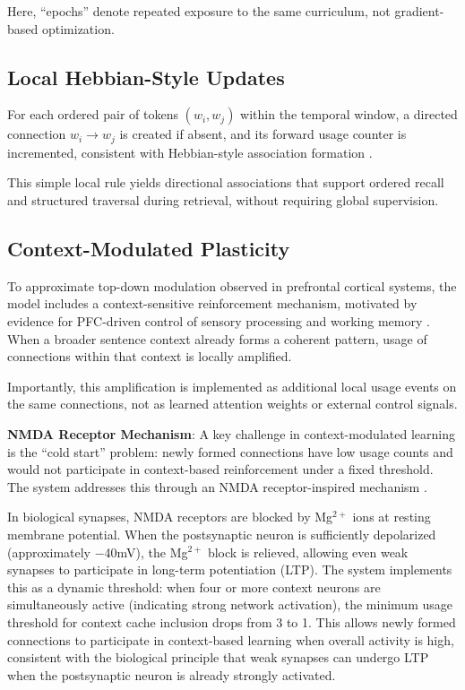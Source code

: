 \documentclass[11pt]{article}
\begin{document}
Here, ``epochs'' denote repeated exposure to the same curriculum, not gradient-based optimization.

\subsection{Local Hebbian-Style Updates}

For each ordered pair of tokens $(w_i, w_j)$ within the temporal window, a directed
connection $w_i \rightarrow w_j$ is created if absent, and its forward usage counter
is incremented, consistent with Hebbian-style association formation \citep{hebb1949organization}.

This simple local rule yields directional associations that support ordered recall
and structured traversal during retrieval, without requiring global supervision.

\subsection{Context-Modulated Plasticity}

To approximate top-down modulation observed in prefrontal cortical systems,
the model includes a context-sensitive reinforcement mechanism, motivated by evidence for
PFC-driven control of sensory processing and working memory \citep{miller2001integrative,zanto2011causal}.
When a broader sentence context already forms a coherent pattern, usage of
connections within that context is locally amplified.

Importantly, this amplification is implemented as additional local usage events
on the same connections, not as learned attention weights or external control
signals.

\textbf{NMDA Receptor Mechanism}: A key challenge in context-modulated learning is the
``cold start'' problem: newly formed connections have low usage counts and would not
participate in context-based reinforcement under a fixed threshold. The system addresses
this through an NMDA receptor-inspired mechanism \citep{malenka2004ltp}.

In biological synapses, NMDA receptors are blocked by Mg$^{2+}$ ions at resting membrane
potential. When the postsynaptic neuron is sufficiently depolarized (approximately $-$40mV),
the Mg$^{2+}$ block is relieved, allowing even weak synapses to participate in long-term
potentiation (LTP). The system implements this as a dynamic threshold: when four or more
context neurons are simultaneously active (indicating strong network activation), the
minimum usage threshold for context cache inclusion drops from 3 to 1. This allows newly
formed connections to participate in context-based learning when overall activity is high,
consistent with the biological principle that weak synapses can undergo LTP when the
postsynaptic neuron is already strongly activated.
\end{document}
